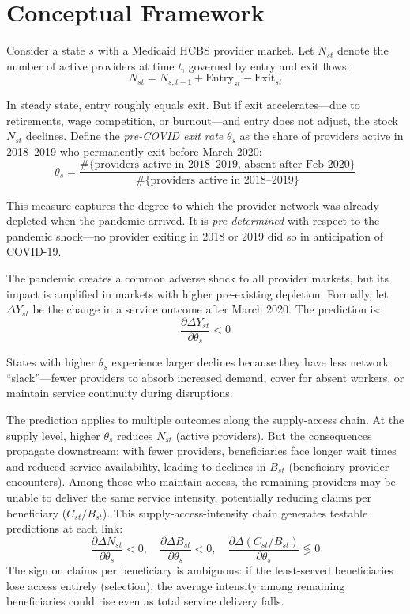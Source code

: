 \documentclass[12pt]{article}
\begin{document}
\section{Conceptual Framework}

Consider a state $s$ with a Medicaid HCBS provider market. Let $N_{st}$ denote the number of active providers at time $t$, governed by entry and exit flows:
\begin{equation}
N_{st} = N_{s,t-1} + \text{Entry}_{st} - \text{Exit}_{st}
\end{equation}

In steady state, entry roughly equals exit. But if exit accelerates---due to retirements, wage competition, or burnout---and entry does not adjust, the stock $N_{st}$ declines. Define the \emph{pre-COVID exit rate} $\theta_s$ as the share of providers active in 2018--2019 who permanently exit before March 2020:
\begin{equation}
\theta_s = \frac{\#\{\text{providers active in 2018--2019, absent after Feb 2020}\}}{\#\{\text{providers active in 2018--2019}\}}
\end{equation}

This measure captures the degree to which the provider network was already depleted when the pandemic arrived. It is \emph{pre-determined} with respect to the pandemic shock---no provider exiting in 2018 or 2019 did so in anticipation of COVID-19.

The pandemic creates a common adverse shock to all provider markets, but its impact is amplified in markets with higher pre-existing depletion. Formally, let $\Delta Y_{st}$ be the change in a service outcome after March 2020. The prediction is:
\begin{equation}
\frac{\partial \Delta Y_{st}}{\partial \theta_s} < 0
\end{equation}

States with higher $\theta_s$ experience larger declines because they have less network ``slack''---fewer providers to absorb increased demand, cover for absent workers, or maintain service continuity during disruptions.

The prediction applies to multiple outcomes along the supply-access chain. At the supply level, higher $\theta_s$ reduces $N_{st}$ (active providers). But the consequences propagate downstream: with fewer providers, beneficiaries face longer wait times and reduced service availability, leading to declines in $B_{st}$ (beneficiary-provider encounters). Among those who maintain access, the remaining providers may be unable to deliver the same service intensity, potentially reducing claims per beneficiary ($C_{st}/B_{st}$). This supply-access-intensity chain generates testable predictions at each link:
\begin{equation}
\frac{\partial \Delta N_{st}}{\partial \theta_s} < 0, \quad \frac{\partial \Delta B_{st}}{\partial \theta_s} < 0, \quad \frac{\partial \Delta (C_{st}/B_{st})}{\partial \theta_s} \lessgtr 0
\end{equation}
The sign on claims per beneficiary is ambiguous: if the least-served beneficiaries lose access entirely (selection), the average intensity among remaining beneficiaries could rise even as total service delivery falls.
\end{document}
